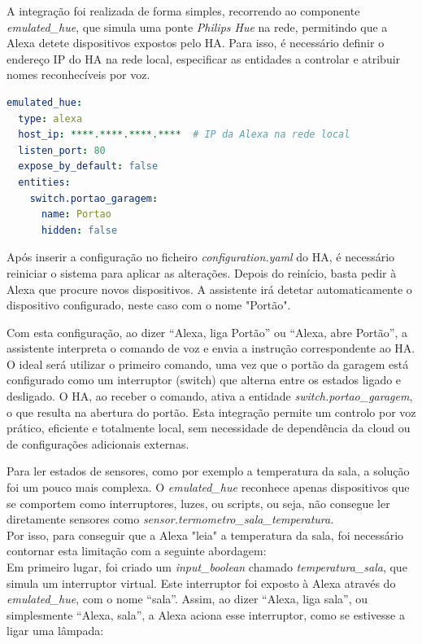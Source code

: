 A integração foi realizada de forma simples, recorrendo ao componente \textit{emulated\_hue}, que simula uma ponte \textit{Philips Hue} na rede, permitindo que a Alexa detete dispositivos expostos pelo HA. Para isso, é necessário definir o endereço IP do HA na rede local, especificar as entidades a controlar e atribuir nomes reconhecíveis por voz.

\lstset{inputencoding=ascii}
\begin{lstlisting}[language=YAML, caption={configuration.yaml}]
emulated_hue:
  type: alexa
  host_ip: ****.****.****.****  # IP da Alexa na rede local
  listen_port: 80
  expose_by_default: false
  entities:
    switch.portao_garagem:
      name: Portao
      hidden: false
\end{lstlisting}

Após inserir a configuração no ficheiro \textit{configuration.yaml} do \gls{HA}, é necessário reiniciar o sistema para aplicar as alterações. Depois do reinício, basta pedir à Alexa que procure novos dispositivos. A assistente irá detetar automaticamente o dispositivo configurado, neste caso com o nome "Portão".

Com esta configuração, ao dizer “Alexa, liga Portão” ou “Alexa, abre Portão”, a assistente interpreta o comando de voz e envia a instrução correspondente ao \gls{HA}. O ideal será utilizar o primeiro comando, uma vez que o portão da garagem está configurado como um interruptor (switch) que alterna entre os estados ligado e desligado. O \gls{HA}, ao receber o comando, ativa a entidade \textit{switch.portao\_garagem}, o que resulta na abertura do portão. Esta integração permite um controlo por voz prático, eficiente e totalmente local, sem necessidade de dependência da cloud ou de configurações adicionais externas.

Para ler estados de sensores, como por exemplo a temperatura da sala, a solução foi um pouco mais complexa. O \textit{emulated\_hue} reconhece apenas dispositivos que se comportem como interruptores, luzes, ou scripts, ou seja, não consegue ler diretamente sensores como \textit{sensor.termometro\_sala\_temperatura}.\\
Por isso, para conseguir que a Alexa "leia" a temperatura da sala, foi necessário contornar esta limitação com a seguinte abordagem:\\

Em primeiro lugar, foi criado um \textit{input\_boolean} chamado \textit{temperatura\_sala}, que simula um interruptor virtual. Este interruptor foi exposto à Alexa através do \textit{emulated\_hue}, com o nome “sala”. Assim, ao dizer “Alexa, liga sala”, ou simplesmente “Alexa, sala”,  a Alexa aciona esse interruptor, como se estivesse a ligar uma lâmpada:


